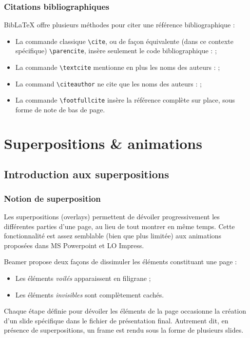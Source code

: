 \documentclass[10pt,    %
    french,             %
    xcolor=table,       %
    envcountsect        %
]{beamer}
\begin{document}
\begin{frame}
    \frametitle{Citations bibliographiques} 
    
    BibLaTeX offre plusieurs méthodes pour citer une référence bibliographique :
    \begin{itemize}
        \item La commande classique \texttt{\textbackslash{}cite}, ou de façon équivalente (dans ce contexte spécifique) \texttt{\textbackslash{}parencite}, insère seulement le code bibliographique : \cite{Labatut2012a} ;
        \item La commande \texttt{\textbackslash{}textcite} mentionne en plus les noms des auteurs : \textcite{Labatut2012a} ;
        \item La command \texttt{\textbackslash{}citeauthor} ne cite que les noms des auteurs : \citeauthor{Labatut2012a} ;
        \item La commande \texttt{\textbackslash{}footfullcite} insère la référence complète sur place, sous forme de note de bas de page.
    \end{itemize}
\end{frame}










\section{Superpositions \& animations}
\label{sec:animations}
\sectionframe

\subsection{Introduction aux superpositions}
\begin{frame}
    \frametitle{Notion de superposition}
    
    Les superpositions (overlays) permettent de dévoiler progressivement les différentes parties d'une page, au lieu de tout montrer en même temps. Cette fonctionnalité est assez semblable (bien que plus limitée) aux animations proposées dans MS Powerpoint et LO Impress.
    
    \vspace{0.25cm}
    Beamer propose deux façons de dissimuler les éléments constituant une page : 
    \begin{itemize}
        \item Les éléments \textit{voilés} apparaissent en filigrane ;
        \item Les éléments \textit{invisibles} sont complètement cachés.
    \end{itemize}
    
    \vspace{0.25cm}
    Chaque étape définie pour dévoiler les éléments de la page occasionne la création d'un slide spécifique dans le fichier de présentation final. Autrement dit, en présence de superpositions, un frame est rendu sous la forme de plusieurs slides.
\end{frame}
\end{document}
